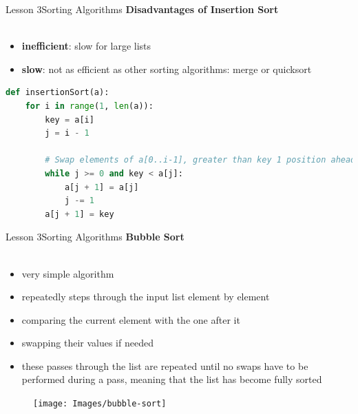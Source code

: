 \documentclass[aspectratio=1610]{beamer}
\begin{document}
\begin{frame}{Lesson 3}{Sorting Algorithms}
\LARGE
\textbf{Disadvantages of Insertion Sort}\\~\\
\Large
\begin{itemize}
	\item \textbf{inefficient}: slow for large lists
	\item \textbf{slow}: not as efficient as other sorting algorithms: merge or quicksort
\end{itemize}

\end{frame}


\begin{frame}[fragile]
\begin{lstlisting}[language=Python]
def insertionSort(a):
    for i in range(1, len(a)):
        key = a[i]
        j = i - 1

        # Swap elements of a[0..i-1], greater than key 1 position ahead
        while j >= 0 and key < a[j]:
            a[j + 1] = a[j]
            j -= 1
        a[j + 1] = key

\end{lstlisting}
\end{frame}






\begin{frame}{Lesson 3}{Sorting Algorithms}
\LARGE
\textbf{Bubble Sort}\\~\\
\begin{minipage}{0.65\textwidth}
\Large
\begin{itemize}
    \item very simple algorithm
    \item repeatedly steps through the input list element by element
    \item comparing the current element with the one after it
    \item swapping their values if needed
    \item these passes through the list are repeated until no swaps have to be performed during a pass, meaning that the list has become fully sorted
\end{itemize}
  \end{minipage}
\begin{minipage}{.0\textwidth}
      \begin{figure}
        \texttt{[image: Images/bubble-sort]}
      \end{figure}
  \end{minipage}  
\end{frame}
\end{document}
